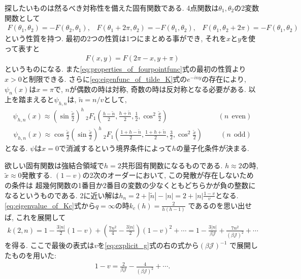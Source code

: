 探したいものは然るべき対称性を備えた固有関数である. 
4点関数は$\theta_1, \theta_2$の2変数関数として
\begin{align}
	F(\theta_1, \theta_2) = -F(\theta_2, \theta_1),\hspace{10pt}
	F(\theta_1 + 2\pi, \theta_2) = -F(\theta_1, \theta_2),\hspace{10pt}
	F(\theta_1, \theta_2 + 2\pi) = -F(\theta_1, \theta_2)
	\label{eq:properties_of_fourpointfunc}
\end{align}
という性質を持つ. 最初の2つの性質は1つにまとめる事ができ, それを$x$と$y$を使って表すと
\begin{align}
	F(x, y) = F(2\pi - x, y + \pi)
\end{align}
というものになる. 
また\eqref{eq:properties_of_fourpointfunc}式の最初の性質より$x > 0$と制限できる. 
さらに\eqref{eq:eigenfunc_of_tilde_K}式の$e^{-iny}$の存在により, 
$\psi_n(x)$は$x=\pi$で, $n$が偶数の時は対称, 奇数の時は反対称となる必要がある. 
以上を踏まえると$\psi_{h,n}$は, $\tilde{n} = n/v$として, 
\begin{align}
	\psi_{h,n}(x)
	\approx \left(\sin\frac{\tilde{x}}{2}\right)^h\ 
	{}_2F_1\left(
		\frac{h-\tilde{n}}{2}, \frac{h+\tilde{n}}{2},
		\frac{1}{2},\cos^2\frac{\tilde{x}}{2}
		\right)\hspace{85pt}(n\ \ \mathrm{even})
	\label{eq:psi_hn_for_even}
\end{align}
\begin{align}
	\psi_{h,n}(x)
	\approx \cos\frac{\tilde{x}}{2}\left(\sin\frac{\tilde{x}}{2}\right)^h\ 
		{}_2F_1\left(
			\frac{1 + h - \tilde{n}}{2},
			\frac{1 + h + \tilde{n}}{2},
			\frac{3}{2},
			\cos^2\frac{\tilde{x}}{2}
		\right)\hspace{30pt}(n\ \ \mathrm{odd})
	\label{eq:psi_hn_for_odd}
\end{align}
となる. $\psi$は$x=0$で消滅するという境界条件によって$h$の量子化条件が決まる. 

欲しい固有関数は強結合領域で$h=2$共形固有関数になるものである. 
$h\approx 2$の時, $\tilde{x}\approx 0$発散する. 
$(1-v)$の2次のオーダーにおいて, この発散が存在しないための条件は
超幾何関数の1番目か2番目の変数の少なくともどちらかが負の整数になるというものである. 
2に近い解は$h_n = 2 + |\tilde{n}| - |n| = 2 + |n|\frac{1-v}{v}$となる. 
\eqref{eq:eigenvalue_of_Kc}式から$q = \infty$の時$k_c(h) = \frac{2}{h(h-1)}$
であるのを思い出せば, これを展開して
\begin{align}
	k(2, n)
	= 1 - \frac{3|n|}{2}(1 - v) + \left(\frac{7n^2}{4} - \frac{3|n|}{2}\right)(1 - v)^2
		+ \cdots
	= 1 - \frac{3|n|}{\beta \mathcal{J}} + \frac{7n^2}{(\beta \mathcal{J})^2} + \cdots
	\label{eq:eigenvalue_at_large_q}
\end{align}
を得る. 
ここで最後の表式は$v$を\eqref{eq:explicit_g}式の右の式から$(\beta \mathcal{J})^{-1}$
で展開したものを用いた:
\begin{align}
	1 - v = \frac{2}{\beta\mathcal{J}} - \frac{4}{(\beta\mathcal{J})^2} + \cdots.
\end{align}

